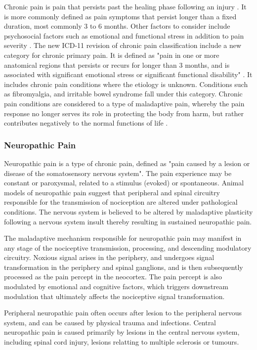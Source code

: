 Chronic pain is pain that persists past the healing phase following an injury \cite{Apkarian2009,Merskey2012}. It is more commonly defined as pain symptoms that persist longer than a fixed duration, most commonly 3 to 6 months. Other factors to consider include psychosocial factors such as emotional and functional stress in addition to pain severity \cite{Treede2015}. The new ICD-11 revision of chronic pain classification include a new category for chronic primary pain. It is defined as "pain in one or more anatomical regions that persists or recurs for longer than 3 months, and is associated with significant emotional stress or significant functional disability" \cite{Treede2015}. It includes chronic pain conditions where the etiology is unknown. Conditions such as fibromyalgia, and irritable bowel syndrome fall under this category. Chronic pain conditions are considered to a type of maladaptive pain, whereby the pain response no longer serves its role in protecting the body from harm, but rather contributes negatively to the normal functions of life \cite{May2008}. 


\subsubsection{Neuropathic Pain}

Neuropathic pain is a type of chronic pain, defined as "pain caused by a lesion or disease of the somatosensory nervous system"\cite{Merskey2012}. The pain experience may be constant or paroxysmal, related to a stimulus (evoked) or spontaneous. Animal models of neuropathic pain suggest that peripheral and spinal circuitry responsible for the transmission of nociception are altered under pathological conditions. The nervous system is believed to be altered by maladaptive plasticity following a nervous system insult thereby resulting in sustained neuropathic pain.

The maladaptive mechanism responsible for neuropathic pain may manifest in any stage of the nociceptive transmission, processing, and descending modulatory circuitry. 
Noxious signal arises in the periphery, and undergoes signal transformation in the periphery and spinal ganglions, and is then subsequently processed as the pain percept in the neocortex. The pain percept is also modulated by emotional and cognitive factors, which triggers downstream modulation that ultimately affects the nociceptive signal transformation. 

Peripheral neuropathic pain often occurs after lesion to the peripheral nervous system, and can be caused by physical trauma and infections. Central neuropathic pain is caused primarily by lesions in the central nervous system, including spinal cord injury, lesions relatting to multiple sclerosis or tumours. 



